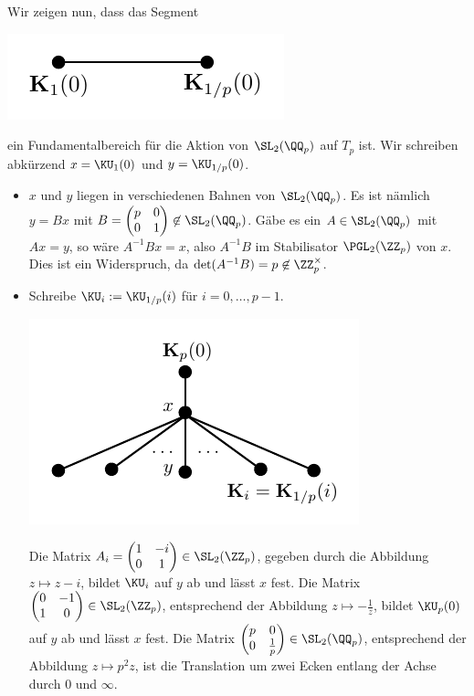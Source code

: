 Wir zeigen nun, dass das Segment
\begin{center}
	\includegraphics{grugraImages/Kkante}
\end{center}
ein Fundamentalbereich für die Aktion von $\SL_2(\QQ_p)$ auf $T_p$
ist. Wir schreiben abkürzend $x=\KU_1(0)$ und $y=\KU_{1/p}(0)$.
\begin{itemize}
\item $x$ und $y$ liegen in verschiedenen Bahnen von $\SL_2(\QQ_p)$.
Es ist nämlich $y=Bx$ mit
$B=\begin{pmatrix} p&0\\ 0&1 \end{pmatrix}\not\in\SL_2(\QQ_p)$.
Gäbe es ein $A\in\SL_2(\QQ_p)$ mit $Ax=y$, so wäre
$A^{-1} B x = x$, also $A^{-1}B$ im Stabilisator $\PGL_2(\ZZ_p)$
von $x$. Dies ist ein Widerspruch, da
$\det(A^{-1}B)=p\not\in\ZZ_p^\times$.
\item Schreibe $\KU_i:=\KU_{1/p}(i)$ für $i=0,\ldots,p-1$.
\begin{center}
	\includegraphics{grugraImages/Ki}
\end{center}
Die Matrix
$A_i=\begin{pmatrix} 1&-i\\ 0&1\end{pmatrix}\in\SL_2(\ZZ_p)$,
gegeben durch die Abbildung
$z\mapsto z-i$, bildet $\KU_i$ auf $y$ ab und lässt $x$ fest.
Die Matrix
$\begin{pmatrix} 0&-1\\ 1&0 \end{pmatrix}\in\SL_2(\ZZ_p)$,
entsprechend der Abbildung $z\mapsto -\frac{1}{z}$, bildet
$\KU_p(0)$ auf $y$ ab und lässt $x$ fest.
Die Matrix
$\begin{pmatrix} p&0\\ 0&\frac{1}{p} \end{pmatrix}\in\SL_2(\QQ_p)$,
entsprechend der Abbildung $z\mapsto p^2z$, ist die Translation
um zwei Ecken entlang der Achse durch $0$ und $\infty$.
\end{itemize}
